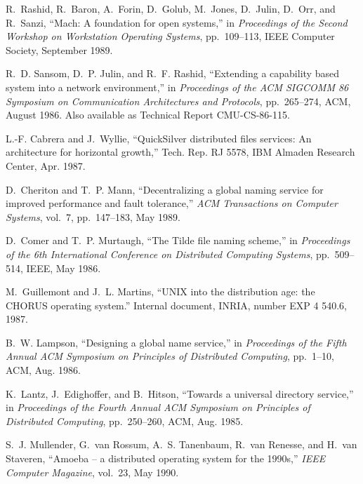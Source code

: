 \begin{thebibliography}{10}

{\footnotesize

R.~Rashid, R.~Baron, A.~Forin, D.~Golub, M.~Jones, D.~Julin, D.~Orr, and
  R.~Sanzi, ``Mach: A foundation for open systems,'' in {\em Proceedings of the
  Second Workshop on Workstation Operating Systems}, pp.~109--113, IEEE
  Computer Society, September 1989.

R.~D. Sansom, D.~P. Julin, and R.~F. Rashid, ``Extending a capability based
  system into a network environment,'' in {\em Proceedings of the ACM SIGCOMM
  86 Symposium on Communication Architectures and Protocols}, pp.~265--274,
  ACM, August 1986.
\newblock Also available as Technical Report CMU-CS-86-115.

L.-F. Cabrera and J.~Wyllie, ``{Q}uick{S}ilver distributed files services: An
  architecture for horizontal growth,'' Tech. Rep. RJ 5578, IBM Almaden
  Research Center, Apr. 1987.

D.~Cheriton and T.~P. Mann, ``Decentralizing a global naming service for
  improved performance and fault tolerance,'' {\em ACM Transactions on Computer
  Systems}, vol.~7, pp.~147--183, May 1989.

D.~Comer and T.~P. Murtaugh, ``The {T}ilde file naming scheme,'' in {\em
  Proceedings of the 6th International Conference on Distributed Computing
  Systems}, pp.~509--514, IEEE, May 1986.

M.~Guillemont and J.~L. Martins, ``{UNIX} into the distribution age: the
  {CHORUS} operating system.'' Internal document, INRIA, number EXP 4 540.6,
  1987.

B.~W. Lampson, ``Designing a global name service,'' in {\em Proceedings of the
  Fifth Annual ACM Symposium on Principles of Distributed Computing},
  pp.~1--10, ACM, Aug. 1986.

K.~Lantz, J.~Edighoffer, and B.~Hitson, ``Towards a universal directory
  service,'' in {\em Proceedings of the Fourth Annual ACM Symposium on
  Principles of Distributed Computing}, pp.~250--260, ACM, Aug. 1985.

S.~J. Mullender, G.~van Rossum, A.~S. Tanenbaum, R.~van Renesse, and H.~van
  Staveren, ``{A}moeba -- a distributed operating system for the 1990s,'' {\em
  IEEE Computer Magazine}, vol.~23, May 1990.

}
\end{thebibliography}
